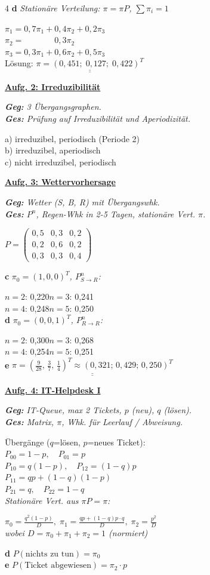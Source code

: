 \documentclass[landscape,a4paper,8pt]{article}
\newcommand{\aufgabe}[1]{\vspace{1pt}\textbf{\underline{#1}}\par}
\newcommand{\teil}[1]{\textbf{#1}\;}
\newcommand{\erkl}[1]{{\small\textit{#1}}\par}
\newcommand{\erg}[1]{\underline{\underline{#1}}}
\begin{document}
\begin{multicols*}{4}
\teil{d} \erkl{Stationäre Verteilung: $\pi=\pi P$, $\sum\pi_i=1$}
$\pi_1=0{,}7\pi_1+0{,}4\pi_2+0{,}2\pi_3$\\
$\pi_2=\phantom{0{,}7\pi_1+{}}0{,}3\pi_2$\\
$\pi_3=0{,}3\pi_1+0{,}6\pi_2+0{,}5\pi_3$\\
Lösung: $\erg{\pi=(0{,}451;\;0{,}127;\;0{,}422)^T}$

\aufgabe{Aufg. 2: Irreduzibilität}
\erkl{\textbf{Geg:} 3 Übergangsgraphen.\\\textbf{Ges:} Prüfung auf Irreduzibilität und Aperiodizität.}
a) irreduzibel, periodisch (Periode 2)\\
b) irreduzibel, aperiodisch\\
c) nicht irreduzibel, periodisch

\aufgabe{Aufg. 3: Wettervorhersage}
\erkl{\textbf{Geg:} Wetter (S, B, R) mit Übergangswhk.\\\textbf{Ges:} $P^n$, Regen-Whk in 2-5 Tagen, stationäre Vert. $\pi$.}
$P=\begin{pmatrix}0{,}5 & 0{,}3 & 0{,}2\\0{,}2 & 0{,}6 & 0{,}2\\0{,}3 & 0{,}3 & 0{,}4\end{pmatrix}$

\teil{c} \erkl{$\pi_0=(1,0,0)^T$, $P^n_{S\to R}$:}
$n{=}2$: 0,220\quad $n{=}3$: 0,241\\
$n{=}4$: 0,248\quad $n{=}5$: 0,250\\
\teil{d} \erkl{$\pi_0=(0,0,1)^T$, $P^n_{R\to R}$:}
$n{=}2$: 0,300\quad $n{=}3$: 0,268\\
$n{=}4$: 0,254\quad $n{=}5$: 0,251\\
\teil{e} $\erg{\pi=\left(\tfrac{9}{28},\,\tfrac{3}{7},\,\tfrac{1}{4}\right)^T\approx(0{,}321;\,0{,}429;\,0{,}250)^T}$

\aufgabe{Aufg. 4: IT-Helpdesk I}
\erkl{\textbf{Geg:} IT-Queue, max 2 Tickets, $p$ (neu), $q$ (lösen).\\\textbf{Ges:} Matrix, $\pi$, Whk. für Leerlauf / Abweisung.}
Übergänge ($q$=lösen, $p$=neues Ticket):\\
$P_{00}=1-p,\quad P_{01}=p$\\
$P_{10}=q(1-p),\quad P_{12}=(1-q)p$\\
$P_{11}=qp+(1-q)(1-p)$\\
$P_{21}=q,\quad P_{22}=1-q$\\[2pt]
\erkl{Stationäre Vert. aus $\pi P=\pi$:}
$\pi_0=\frac{q^2(1-p)}{D},\;\pi_1=\frac{q p+(1-q)p\cdot q}{D},\;\pi_2=\frac{p^2}{D}$\\
\erkl{wobei $D=\pi_0+\pi_1+\pi_2=1$ (normiert)}
\teil{d} $P(\text{nichts zu tun})=\pi_0$\\
\teil{e} $P(\text{Ticket abgewiesen})=\pi_2\cdot p$


\end{multicols*}
\end{document}
